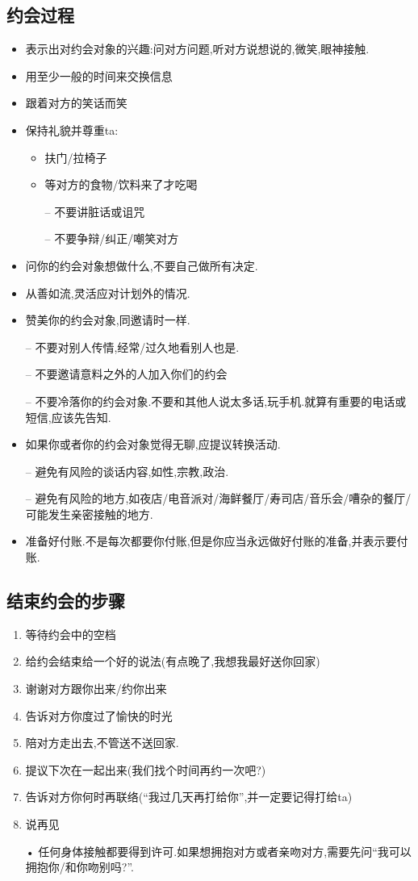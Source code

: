 \documentclass[UTF8]{article}
\newcommand{\Dot}{•}
\newcommand{\dash}{–}
\begin{document}
\subsection{约会过程}
\begin{itemize}
\item 表示出对约会对象的兴趣:问对方问题,听对方说想说的,微笑,眼神接触.
\item 用至少一般的时间来交换信息
\item 跟着对方的笑话而笑
\item 保持礼貌并尊重ta:\begin{itemize}
    \item 扶门/拉椅子
    \item 等对方的食物/饮料来了才吃喝
    \item[\dash] 不要讲脏话或诅咒
    \item[\dash] 不要争辩/纠正/嘲笑对方
\end{itemize}
\item 问你的约会对象想做什么,不要自己做所有决定.
\item 从善如流,灵活应对计划外的情况.
\item 赞美你的约会对象,同邀请时一样.
\item[\dash] 不要对别人传情,经常/过久地看别人也是.
\item[\dash] 不要邀请意料之外的人加入你们的约会
\item[\dash] 不要冷落你的约会对象.不要和其他人说太多话,玩手机.就算有重要的电话或短信,应该先告知.
\item 如果你或者你的约会对象觉得无聊,应提议转换活动.
\item[\dash] 避免有风险的谈话内容,如性,宗教,政治.
\item[\dash] 避免有风险的地方,如夜店/电音派对/海鲜餐厅/寿司店/音乐会/嘈杂的餐厅/可能发生亲密接触的地方.
\item 准备好付账.不是每次都要你付账,但是你应当永远做好付账的准备,并表示要付账.
\end{itemize}

\subsection{结束约会的步骤}
\begin{enumerate}
\item 等待约会中的空档
\item 给约会结束给一个好的说法(有点晚了,我想我最好送你回家)
\item 谢谢对方跟你出来/约你出来
\item 告诉对方你度过了愉快的时光
\item 陪对方走出去,不管送不送回家.
\item 提议下次在一起出来(我们找个时间再约一次吧?)
\item 告诉对方你何时再联络(``我过几天再打给你'',并一定要记得打给ta)
\item 说再见
\item[\Dot] 任何身体接触都要得到许可.如果想拥抱对方或者亲吻对方,需要先问``我可以拥抱你/和你吻别吗?''.
\end{enumerate}
\end{document}
